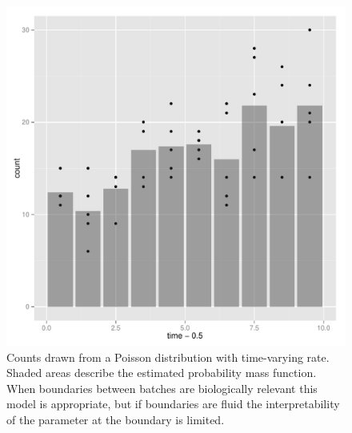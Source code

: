 \begin{knitrout}
\color{fgcolor}\begin{kframe}
\begin{alltt}
\hlstd{(} \hlstd{=}\hlstd{))}
\end{alltt}
\end{kframe}
\end{knitrout}

\begin{knitrout}
\color{fgcolor}\begin{kframe}
\begin{alltt}
 \hlkwb{<-} \hlstd{(}\hlstd{=} \hlstd{))}
\end{alltt}
\end{kframe}\begin{figure}[]

\includegraphics[width=\maxwidth]{figure/print-discrete-homo} \caption[Counts drawn from a Poisson distribution with time-varying rate]{Counts drawn from a Poisson distribution with time-varying rate.  Shaded areas describe the estimated probability mass function.  When boundaries between batches are biologically relevant this model is appropriate, but if boundaries are fluid the interpretability of the parameter at the boundary is limited.\label{fig:print-discrete-homo}}
\end{figure}


\end{knitrout}

